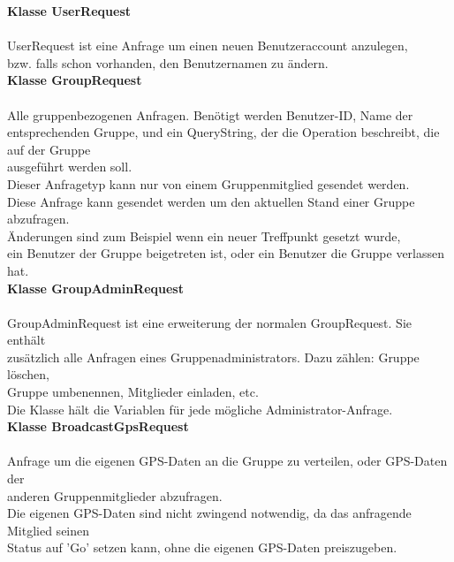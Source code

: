 \textbf{Klasse UserRequest}\\
\\
UserRequest ist eine Anfrage um einen neuen Benutzeraccount anzulegen, \\
bzw. falls schon vorhanden, den Benutzernamen zu ändern.\\

\textbf{Klasse GroupRequest}\\
\\
Alle gruppenbezogenen Anfragen. Benötigt werden Benutzer-ID, Name der entsprechenden
Gruppe, und ein QueryString, der die Operation beschreibt, die auf der Gruppe\\
ausgeführt werden soll.\\
Dieser Anfragetyp kann nur von einem Gruppenmitglied gesendet werden.\\
Diese Anfrage kann gesendet werden um den aktuellen Stand einer Gruppe abzufragen.\\
Änderungen sind zum Beispiel wenn ein neuer Treffpunkt gesetzt wurde, \\
ein Benutzer der Gruppe beigetreten ist, oder ein Benutzer die Gruppe verlassen hat.\\

\textbf{Klasse GroupAdminRequest}\\
\\
GroupAdminRequest ist eine erweiterung der normalen GroupRequest. Sie enthält\\
zusätzlich alle Anfragen eines Gruppenadministrators. Dazu zählen: Gruppe löschen,\\
Gruppe umbenennen, Mitglieder einladen, etc.\\
Die Klasse hält die Variablen für jede mögliche Administrator-Anfrage.\\

\textbf{Klasse BroadcastGpsRequest}\\
\\
Anfrage um die eigenen GPS-Daten an die Gruppe zu verteilen, oder GPS-Daten der\\
anderen Gruppenmitglieder abzufragen.\\
Die eigenen GPS-Daten sind nicht zwingend notwendig, da das anfragende Mitglied seinen\\
Status auf 'Go' setzen kann, ohne die eigenen GPS-Daten preiszugeben.\\

